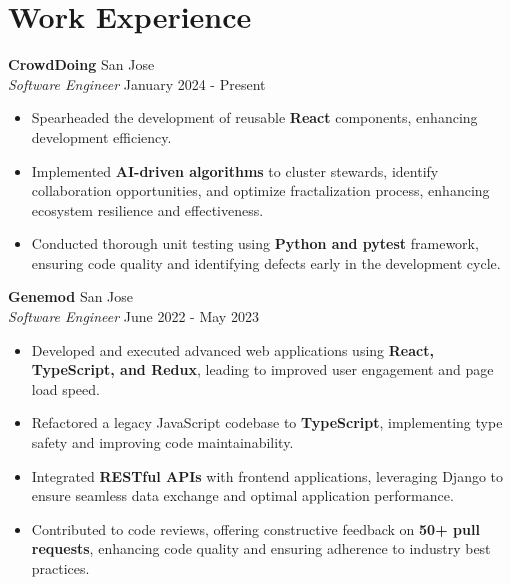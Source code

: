 \documentclass[a4paper,10pt]{article}
\begin{document}
\section*{Work Experience}\vspace{0.5mm}
\noindent \textbf{CrowdDoing} \hfill {San Jose}\\
\vspace{0.5mm}
\textit{Software Engineer} \hfill {January 2024 - Present}\vspace{-\baselineskip}
\vspace{2.5mm}
\begin{itemize}
    \item Spearheaded the development of reusable \textbf{React} components, enhancing development efficiency.\vspace{0.3ex}
    \item Implemented \textbf{AI-driven algorithms} to cluster stewards, identify collaboration opportunities, and optimize fractalization process, enhancing ecosystem resilience and effectiveness.\vspace{0.3ex}
    \item Conducted thorough unit testing using \textbf{Python and pytest} framework, ensuring code quality and identifying defects early in the development cycle.\vspace{0.3ex}
\end{itemize}

\vspace{3mm}

\noindent \textbf{Genemod} \hfill {San Jose}\\
\textit{Software Engineer} \hfill {June 2022 - May 2023}\vspace{-\baselineskip}
\vspace{2.5mm}
\begin{itemize}
    \item Developed and executed advanced web applications using \textbf{React, TypeScript, and Redux}, leading to improved user engagement and page load speed.\vspace{0.3ex}
    \item Refactored a legacy JavaScript codebase to \textbf{TypeScript}, implementing type safety and improving code maintainability.\vspace{0.3ex}
    \item Integrated \textbf{RESTful APIs} with frontend applications, leveraging Django to ensure seamless data exchange and optimal application performance.\vspace{0.3ex}
    \item Contributed to code reviews, offering constructive feedback on \textbf{50+ pull requests}, enhancing code quality and ensuring adherence to industry best practices.\vspace{0.3ex}
\end{itemize}
\end{document}
